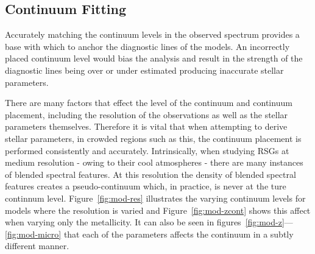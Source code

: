 \documentclass[12pt]{article}
\begin{document}
\subsection{Continuum Fitting} %
\label{sub:continuum_fitting}

Accurately matching the continuum levels in the observed
spectrum provides a base with which to anchor the diagnostic lines of the models.
An incorrectly placed continuum level would bias the analysis and result in the
strength of the diagnostic lines being over or under estimated producing inaccurate stellar parameters.

There are many factors that effect the level of the continuum and continuum placement,
including the resolution of the observations as well as the stellar parameters themselves.
Therefore it is vital that when attempting to derive stellar parameters,
in crowded regions such as this, the continuum placement is performed
consistently and accurately.
Intrinsically, when studying RSGs at medium resolution - owing  to their cool atmospheres -
there are many instances of blended spectral features.
At this resolution the density of blended spectral features creates a pseudo-continuum which, in practice,
is never at the ture continnum level.
Figure~\ref{fig:mod-res} illustrates the varying continuum levels for models where the resolution is varied and
Figure~\ref{fig:mod-zcont} shows this affect when varying only the metallicity.
It can also be seen in figures~\ref{fig:mod-z}---\ref{fig:mod-micro} that each of the parameters affects the continuum in a subtly different manner.
\end{document}
